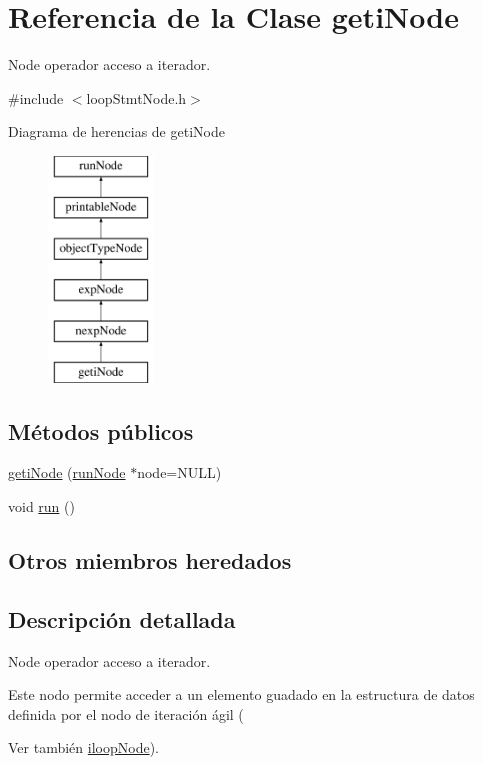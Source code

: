\hypertarget{classgetiNode}{\section{Referencia de la Clase geti\-Node}
\label{classgetiNode}
}


Node operador acceso a iterador.  




{\ttfamily \#include $<$loop\-Stmt\-Node.\-h$>$}

Diagrama de herencias de geti\-Node\begin{figure}[H]
\begin{center}
\leavevmode
\includegraphics[height=6.000000cm]{classgetiNode}
\end{center}
\end{figure}
\subsection*{Métodos públicos}
\begin{DoxyCompactItemize}
\item 
\hyperlink{classgetiNode_aca40b64a5f24608be0e5d5df02ca187e}{geti\-Node} (\hyperlink{classrunNode}{run\-Node} $\ast$node=N\-U\-L\-L)
\item 
void \hyperlink{classgetiNode_a83eb646bc0da75725c7363215c8e1737}{run} ()
\end{DoxyCompactItemize}
\subsection*{Otros miembros heredados}


\subsection{Descripción detallada}
Node operador acceso a iterador. 

Este nodo permite acceder a un elemento guadado en la estructura de datos definida por el nodo de iteración ágil (\begin{DoxySeeAlso}{Ver también}
\hyperlink{classiloopNode}{iloop\-Node}). 
\end{DoxySeeAlso}


